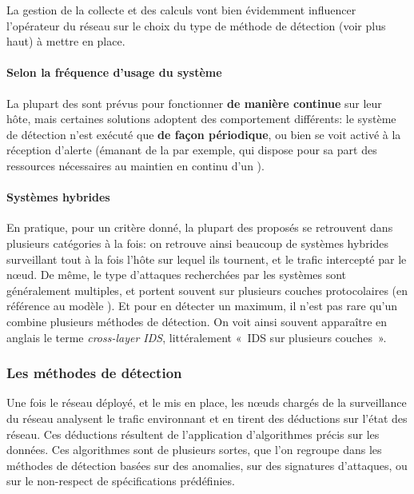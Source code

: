 La gestion de la collecte et des calculs vont bien évidemment influencer l'opérateur du réseau sur le choix du type de méthode de détection (voir plus haut) à mettre en place.

        \paragraph{Selon la fréquence d'usage du système}
La plupart des \IDS sont prévus pour fonctionner \textbf{de manière continue} sur leur hôte, mais certaines solutions adoptent des comportement différents: le système de détection n'est exécuté que \textbf{de façon périodique}, ou bien se voit activé à la réception d'alerte (émanant de la \sdb par exemple, qui dispose pour sa part des ressources nécessaires au maintien en continu d'un \IDS).

        \paragraph{Systèmes hybrides}
En pratique, pour un critère donné, la plupart des \IDS proposés se retrouvent dans plusieurs catégories à la fois: on retrouve ainsi beaucoup de systèmes hybrides surveillant tout à la fois l'hôte sur lequel ils tournent, et le trafic intercepté par le nœud.
De même, le type d'attaques recherchées par les systèmes sont généralement multiples, et portent souvent sur plusieurs couches protocolaires (en référence au modèle \tcpip).
Et pour en détecter un maximum, il n'est pas rare qu'un \IDS combine plusieurs méthodes de détection.
On voit ainsi souvent apparaître en anglais le terme \textit{cross-layer IDS}, littéralement « IDS sur plusieurs couches ».

    \subsubsection{Les méthodes de détection}\label{ea:sss:detect}
Une fois le réseau déployé, et le \ids mis en place, les nœuds chargés de la surveillance du réseau analysent le trafic environnant et en tirent des déductions sur l'état des réseau.
Ces déductions résultent de l'application d'algorithmes précis sur les données.
Ces algorithmes sont de plusieurs sortes, que l'on regroupe dans les méthodes de détection basées sur des anomalies, sur des signatures d'attaques, ou sur le non-respect de spécifications prédéfinies.

